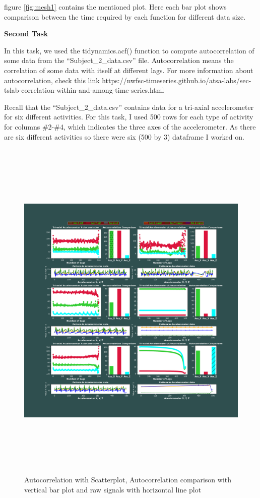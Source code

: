 \documentclass{article}
\begin{document}
figure \ref{fig:mesh1} contains the mentioned plot. Here each bar plot shows comparison between the time required by each function for different data size.

\vspace{0.5cm}
\textbf{Second Task}

In this task, we used the tidynamics.acf() function to compute autocorrelation of some data from the “Subject\_2\_data.csv” file. Autocorrelation means the correlation of some data with itself at different lags. For more information about autocorrelation, check this link https://nwfsc-timeseries.github.io/atsa-labs/sec-tslab-correlation-within-and-among-time-series.html 

Recall that the “Subject\_2\_data.csv” contains data for a tri-axial accelerometer for six different activities. For this task, I used 500 rows for each type of activity for columns \#2-\#4, which indicates the three axes of the accelerometer. As there are six different activities so there were six (500 by 3) dataframe I worked on. 

\begin{figure}
\hspace*{-2cm}
    \includegraphics[width=16cm,height=17cm]{Acf_activities}
    \caption{Autocorrelation with Scatterplot, Autocorrelation comparison with vertical bar plot and raw signals with horizontal line plot}
    \label{fig:mesh2}
\end{figure}
\end{document}
